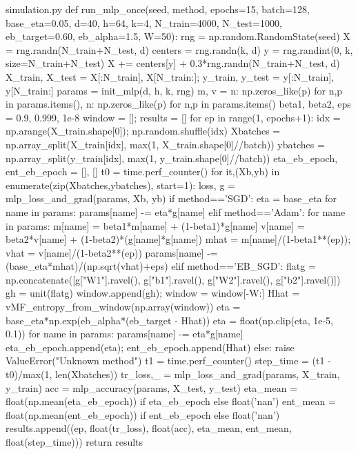 \begin{filecontents*}{simulation.py}
def run_mlp_once(seed, method, epochs=15, batch=128, base_eta=0.05, d=40, h=64, k=4, N_train=4000, N_test=1000,
                 eb_target=0.60, eb_alpha=1.5, W=50):
    rng = np.random.RandomState(seed)
    X = rng.randn(N_train+N_test, d)
    centers = rng.randn(k, d)
    y = rng.randint(0, k, size=N_train+N_test)
    X += centers[y] + 0.3*rng.randn(N_train+N_test, d)
    X_train, X_test = X[:N_train], X[N_train:]; y_train, y_test = y[:N_train], y[N_train:]
    params = init_mlp(d, h, k, rng)
    m, v = {n: np.zeros_like(p) for n,p in params.items()}, {n: np.zeros_like(p) for n,p in params.items()}
    beta1, beta2, eps = 0.9, 0.999, 1e-8
    window = []; results = []
    for ep in range(1, epochs+1):
        idx = np.arange(X_train.shape[0]); np.random.shuffle(idx)
        Xbatches = np.array_split(X_train[idx], max(1, X_train.shape[0]//batch))
        ybatches = np.array_split(y_train[idx], max(1, y_train.shape[0]//batch))
        eta_eb_epoch, ent_eb_epoch = [], []
        t0 = time.perf_counter()
        for it,(Xb,yb) in enumerate(zip(Xbatches,ybatches), start=1):
            loss, g = mlp_loss_and_grad(params, Xb, yb)
            if method=='SGD':
                eta = base_eta
                for name in params: params[name] -= eta*g[name]
            elif method=='Adam':
                for name in params:
                    m[name] = beta1*m[name] + (1-beta1)*g[name]
                    v[name] = beta2*v[name] + (1-beta2)*(g[name]*g[name])
                    mhat = m[name]/(1-beta1**(ep)); vhat = v[name]/(1-beta2**(ep))
                    params[name] -= (base_eta*mhat)/(np.sqrt(vhat)+eps)
            elif method=='EB_SGD':
                flatg = np.concatenate([g["W1"].ravel(), g["b1"].ravel(), g["W2"].ravel(), g["b2"].ravel()])
                gh = unit(flatg)
                window.append(gh); window = window[-W:]
                Hhat = vMF_entropy_from_window(np.array(window))
                eta = base_eta*np.exp(eb_alpha*(eb_target - Hhat))
                eta = float(np.clip(eta, 1e-5, 0.1))
                for name in params: params[name] -= eta*g[name]
                eta_eb_epoch.append(eta); ent_eb_epoch.append(Hhat)
            else:
                raise ValueError("Unknown method")
        t1 = time.perf_counter()
        step_time = (t1 - t0)/max(1, len(Xbatches))
        tr_loss,_ = mlp_loss_and_grad(params, X_train, y_train)
        acc = mlp_accuracy(params, X_test, y_test)
        eta_mean = float(np.mean(eta_eb_epoch)) if eta_eb_epoch else float('nan')
        ent_mean = float(np.mean(ent_eb_epoch)) if ent_eb_epoch else float('nan')
        results.append((ep, float(tr_loss), float(acc), eta_mean, ent_mean, float(step_time)))
    return results


\end{filecontents*}
